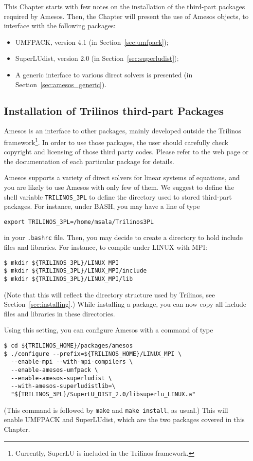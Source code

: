 This Chapter starts with few notes on the installation of the third-part
packages required by Amesos. Then, the Chapter will present the use of
Amesos objects, to interface with the following packages:
\begin{itemize}
\item UMFPACK, version 4.1 (in Section~\ref{sec:umfpack});
\item SuperLUdist, version 2.0 (in Section~\ref{sec:superludist});
\item A generic interface to various direct solvers is presented (in
  Section~\ref{sec:amesos_generic}).
\end{itemize}


\subsection{Installation of Trilinos third-part Packages}
\label{sec:3pl}

Amesos is an interface to other packages, mainly developed outside the
Trilinos framework\footnote{Currently, SuperLU is included in the
  Trilinos framework.}. In order to use those packages, the user should
carefully check copyright and licensing of those third party codes.
Please refer to the web page or the documentation of each particular
package for details. 

Amesos supports a variety of direct solvers for linear systems of
equations, and you are likely to use Amesos with only few of them. We
suggest to define the shell variable \verb!TRILINOS_3PL!  to define the
directory used to stored third-part packages. For instance, under BASH,
you may have a line of type
\begin{verbatim}
export TRILINOS_3PL=/home/msala/Trilinos3PL
\end{verbatim}
in your \verb!.bashrc! file. Then, you may decide to create a directory
to hold include files and libraries. For instance, to compile under
LINUX with MPI:
\begin{verbatim}
$ mkdir ${TRILINOS_3PL}/LINUX_MPI
$ mkdir ${TRILINOS_3PL}/LINUX_MPI/include
$ mkdir ${TRILINOS_3PL}/LINUX_MPI/lib
\end{verbatim}
(Note that this will reflect the directory structure used by Trilinos,
see Section~\ref{sec:installing}.) While installing a package, you can
now copy all include files and libraries in these directories.

Using this setting, you can configure Amesos with a command of type
\begin{verbatim}
$ cd ${TRILINOS_HOME}/packages/amesos
$ ./configure --prefix=${TRILINOS_HOME}/LINUX_MPI \
  --enable-mpi --with-mpi-compilers \
  --enable-amesos-umfpack \
  --enable-amesos-superludist \
  --with-amesos-superludistlib=\
  "${TRILINOS_3PL}/SuperLU_DIST_2.0/libsuperlu_LINUX.a"
\end{verbatim}
(This command is followed by \verb!make! and \verb!make install!, as
usual.)  This will enable UMFPACK and SuperLUdist, which are the two
packages covered in this Chapter.


